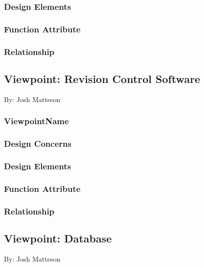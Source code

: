 \documentclass[letterpaper, 10pt, draftclsnofoot, compsoc, onecolumn]{IEEEtran}
\begin{document}
\subsubsection{Design Elements}
{\noindent  \par}

\subsubsection{Function Attribute}
{\noindent  \par}

\subsubsection{Relationship}


\subsection{Viewpoint: Revision Control Software}
{\noindent By: Josh Matteson \par}

\subsubsection{ViewpointName}
{\noindent  \par}

\subsubsection{Design Concerns}
{\noindent  \par}

\subsubsection{Design Elements}
{\noindent  \par}

\subsubsection{Function Attribute}
{\noindent  \par}

\subsubsection{Relationship}


\subsection{Viewpoint: Database}
{\noindent By: Josh Matteson \par}
\end{document}
